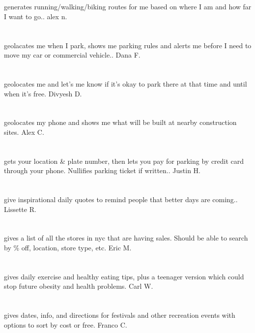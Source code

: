 \section{}generates running/walking/biking routes for me based on where I am and how far I want to go.. alex n.
\section{}geolacates me when I park,  shows me parking rules and alerts me before I need to move my car or commercial vehicle.. Dana F.
\section{}geolocates me and let's me know if it's okay to park there at that time and until when it's free. Divyesh D.
\section{}geolocates my phone and shows me what will be built at nearby construction sites. Alex C.
\section{}gets your location \& plate number,  then lets you pay for parking by credit card through your phone. Nullifies parking ticket if written.. Justin H.
\section{}give inspirational daily quotes to remind people that better days are coming.. Lissette R.
\section{} gives a list of all the stores in nyc that are having sales.  Should be able to search by \% off,  location,  store type,  etc. Eric M.
\section{}gives daily exercise and healthy eating tips,  plus a teenager version which could stop future obesity and health problems. Carl W.
\section{}gives dates,  info,  and directions for festivals and other recreation events with options to sort by cost or free. Franco C.
